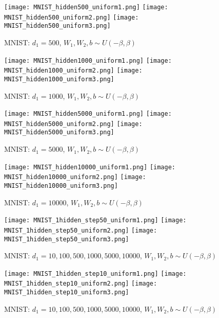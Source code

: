  \begin{figure}[H]
	\centering
	\texttt{[image: MNIST\_hidden500\_uniform1.png]}
	\texttt{[image: MNIST\_hidden500\_uniform2.png]}
	\texttt{[image: MNIST\_hidden500\_uniform3.png]}
	\caption{MNIST: $d_1 = 500$, $W_1,W_2,b \sim U(-\beta,\beta)$}
\end{figure}

 \begin{figure}[H]
	\centering
	\texttt{[image: MNIST\_hidden1000\_uniform1.png]}
	\texttt{[image: MNIST\_hidden1000\_uniform2.png]}
	\texttt{[image: MNIST\_hidden1000\_uniform3.png]}
	\caption{MNIST: $d_1 = 1000$, $W_1,W_2,b \sim U(-\beta,\beta)$}
\end{figure}
 
  \begin{figure}[H]
 	\centering
 	\texttt{[image: MNIST\_hidden5000\_uniform1.png]}
 	\texttt{[image: MNIST\_hidden5000\_uniform2.png]}
 	\texttt{[image: MNIST\_hidden5000\_uniform3.png]}
 	\caption{MNIST: $d_1 = 5000$, $W_1,W_2,b \sim U(-\beta,\beta)$}
 \end{figure}
 
   \begin{figure}[H]
 	\centering
 	\texttt{[image: MNIST\_hidden10000\_uniform1.png]}
 	\texttt{[image: MNIST\_hidden10000\_uniform2.png]}
 	\texttt{[image: MNIST\_hidden10000\_uniform3.png]}
 	\caption{MNIST: $d_1 = 10000$, $W_1,W_2,b \sim U(-\beta,\beta)$}
 \end{figure}

   \begin{figure}[H]
	\centering
	\texttt{[image: MNIST\_1hidden\_step50\_uniform1.png]}
	\texttt{[image: MNIST\_1hidden\_step50\_uniform2.png]}
	\texttt{[image: MNIST\_1hidden\_step50\_uniform3.png]}
	\caption{MNIST: $d_1 = 10,100,500,1000,5000,10000$, $W_1,W_2,b \sim U(-\beta,\beta)$}
\end{figure}
 
    \begin{figure}[H]
 	\centering
 	\texttt{[image: MNIST\_1hidden\_step10\_uniform1.png]}
 	\texttt{[image: MNIST\_1hidden\_step10\_uniform2.png]}
 	\texttt{[image: MNIST\_1hidden\_step10\_uniform3.png]}
 	\caption{MNIST: $d_1 = 10,100,500,1000,5000,10000$, $W_1,W_2,b \sim U(-\beta,\beta)$}
 \end{figure}
 